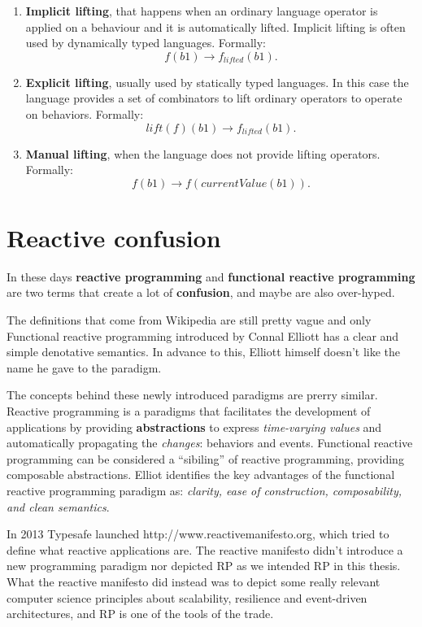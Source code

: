 \begin{enumerate}
\def\labelenumi{\arabic{enumi}.}
\item
  \textbf{Implicit lifting}, that happens when an ordinary language
  operator is applied on a behaviour and it is automatically lifted.
  Implicit lifting is often used by dynamically typed languages.
  Formally: \[
  f(b1)  \rightarrow f_{lifted}(b1) .
  \]
\item
  \textbf{Explicit lifting}, usually used by statically typed languages.
  In this case the language provides a set of combinators to lift
  ordinary operators to operate on behaviors. Formally: \[
  lift(f)(b1)  \rightarrow f_{lifted}(b1) .
  \]
\item
  \textbf{Manual lifting}, when the language does not provide lifting
  operators. Formally: \[
  f(b1)  \rightarrow f(currentValue(b1)) .
  \]
\end{enumerate}


\section{Reactive confusion}\label{reactive-confusion}

In these days \textbf{reactive programming} and \textbf{functional
reactive programming} are two terms that create a lot of
\textbf{confusion}, and maybe are also over-hyped.

The definitions that come from Wikipedia are still pretty vague and only
Functional reactive programming introduced by Connal Elliott has a clear
and simple denotative semantics. In advance to this, Elliott himself
doesn't like the name he gave to the paradigm.

The concepts behind these newly introduced paradigms are prerry similar.
Reactive programming is a paradigms that facilitates the development of
applications by providing \textbf{abstractions} to express
\emph{time-varying values} and automatically propagating the
\emph{changes}: behaviors and events. Functional reactive programming
can be considered a ``sibiling'' of reactive programming, providing
composable abstractions. Elliot identifies the key advantages of the
functional reactive programming paradigm as: \emph{clarity, ease of
construction, composability, and clean semantics}.

In 2013 Typesafe launched http://www.reactivemanifesto.org, which tried
to define what reactive applications are. The reactive manifesto didn't
introduce a new programming paradigm nor depicted RP as we intended RP
in this thesis. What the reactive manifesto did instead was to depict
some really relevant computer science principles about scalability,
resilience and event-driven architectures, and RP is one of the tools of
the trade.

